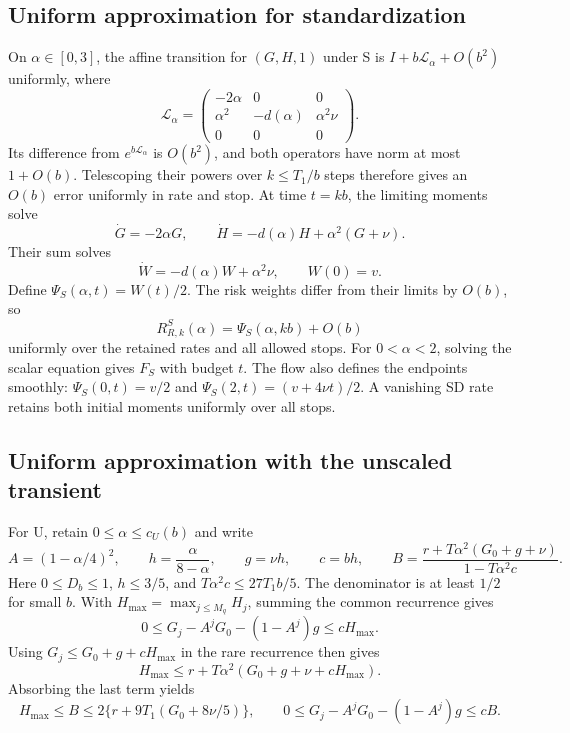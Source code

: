 \subsection{Uniform approximation for standardization}

On $\alpha\in[0,3]$, the affine transition for $(G,H,1)$ under S is
$I+b\mathcal L_\alpha+O(b^2)$ uniformly, where
\[
  \mathcal L_\alpha=
  \begin{pmatrix}
    -2\alpha&0&0\\
    \alpha^2&-d(\alpha)&\alpha^2\nu\\
    0&0&0
  \end{pmatrix}.
\]
Its difference from $e^{b\mathcal L_\alpha}$ is $O(b^2)$, and both operators
have norm at most $1+O(b)$. Telescoping their powers over $k\leq T_1/b$
steps therefore gives an $O(b)$ error uniformly in rate and stop. At time
$t=kb$, the limiting moments solve
\[
  \dot G=-2\alpha G,\qquad
  \dot H=-d(\alpha)H+\alpha^2(G+\nu).
\]
Their sum solves
\[
  \dot W=-d(\alpha)W+\alpha^2\nu,\qquad W(0)=v.
\]
Define $\Psi_S(\alpha,t)=W(t)/2$. The risk weights differ from their limits
by $O(b)$, so
\begin{equation}
  R^S_{R,k}(\alpha)=\Psi_S(\alpha,kb)+O(b)
  \label{eq:limit-s-uniform}
\end{equation}
uniformly over the retained rates and all allowed stops. For $0<\alpha<2$,
solving the scalar equation gives $F_S$ with budget $t$. The flow also defines
the endpoints smoothly: $\Psi_S(0,t)=v/2$ and
$\Psi_S(2,t)=(v+4\nu t)/2$. A vanishing SD rate retains both initial
moments uniformly over all stops.

\subsection{Uniform approximation with the unscaled transient}

For U, retain $0\leq\alpha\leq c_U(b)$ and write
\[
  A=(1-\alpha/4)^2,\qquad
  h=\frac{\alpha}{8-\alpha},\qquad g=\nu h,\qquad c=bh,
  \qquad
  B=\frac{r+T\alpha^2(G_0+g+\nu)}{1-T\alpha^2c}.
\]
Here $0\leq D_b\leq1$, $h\leq3/5$, and
$T\alpha^2c\leq27T_1b/5$. The denominator is at least $1/2$ for small $b$.
With $H_{\max}=\max_{j\leq M_q}H_j$, summing the common recurrence gives
\[
  0\leq G_j-A^jG_0-(1-A^j)g\leq cH_{\max}.
\]
Using $G_j\leq G_0+g+cH_{\max}$ in the rare recurrence then gives
\[
  H_{\max}\leq r+T\alpha^2(G_0+g+\nu+cH_{\max}).
\]
Absorbing the last term yields
\[
  H_{\max}\leq B\leq2\{r+9T_1(G_0+8\nu/5)\},\qquad
  0\leq G_j-A^jG_0-(1-A^j)g\leq cB.
\]

